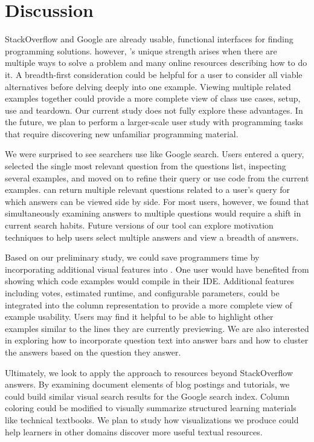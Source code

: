 \section{Discussion}

StackOverflow and Google are already usable, functional interfaces for finding programming solutions.
however, \systemname{}'s unique strength arises when there are multiple ways to solve a problem and many online resources describing how to do it.
A breadth-first consideration could be helpful for a user to consider all viable alternatives before delving deeply into one example.
Viewing multiple related examples together could provide a more complete view of class use cases, setup, use and teardown.
Our current study does not fully explore these advantages.
In the future, we plan to perform a larger-scale user study with programming tasks that require discovering new unfamiliar programming material.

We were surprised to see searchers use \systemname{} like Google search.
Users entered a query, selected the single most relevant question from the questions list, inspecting several examples, and moved on to refine their query or use code from the current examples.
\systemname{} can return multiple relevant questions related to a user's query for which answers can be viewed side by side.
For most users, however, we found that simultaneously examining answers to multiple questions would require a shift in current search habits.
Future versions of our tool can explore motivation techniques to help users select multiple answers and view a breadth of answers.

Based on our preliminary study, we could save programmers time by incorporating additional visual features into \systemname{}.
One user would have benefited from showing which code examples would compile in their IDE.
Additional features including votes, estimated runtime, and configurable parameters, could be integrated into the column representation to provide a more complete view of example usability.
Users may find it helpful to be able to highlight other examples similar to the lines they are currently previewing.
We are also interested in exploring how to incorporate question text into answer bars and how to cluster the answers based on the question they answer.

Ultimately, we look to apply the \systemname{} approach to resources beyond StackOverflow answers.
By examining document elements of blog postings and tutorials, we could build similar visual search results for the Google search index.
Column coloring could be modified to visually summarize structured learning materials like technical textbooks.
We plan to study how visualizations we produce could help learners in other domains discover more useful textual resources.